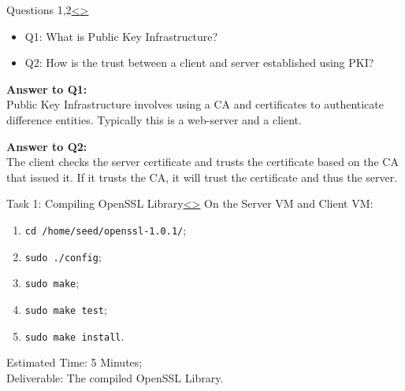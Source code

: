 \documentclass[12pt]{extarticle}
\newenvironment{instructionblock}{\Large\bgroup}{\egroup}
\newcommand{\ben}{\begin{enumerate}}
\newcommand{\een}{\end{enumerate}}
\newcommand{\bi}{\begin{itemize}}
\newcommand{\ei}{\end{itemize}}
\begin{document}

\pagebreak
\begin{slide}{Questions 1,2}{\hyperref[slide 6]{\textless}\hyperref[slide 8]{\textgreater}}
\begin{instructionblock}
\bi 
\item[Q1:] What is Public Key Infrastructure?
\item[Q2:] How is the trust between a client and server established using PKI?
\ei

\end{instructionblock}
\end{slide}
\vfill

\vspace{2mm}
\noindent
\textbf{Answer to Q1:}\\
Public Key Infrastructure involves using a CA and certificates to authenticate difference entities. Typically this is a web-server and a client.

\vspace{6mm}
\noindent
\textbf{Answer to Q2:}\\
The client checks the server certificate and trusts the certificate based on the CA that issued it. If it trusts the CA, it will trust the certificate and thus the server.


\pagebreak
\begin{slide}{Task 1: Compiling OpenSSL Library}{\hyperref[slide 7]{\textless}\hyperref[slide 9]{\textgreater}}
	\begin{instructionblock}
		On the Server VM and Client VM:
		\ben
			\item \texttt{cd /home/seed/openssl-1.0.1/};
			\item \texttt{sudo ./config};
			\item \texttt{sudo make};
			\item \texttt{sudo make test};
			\item \texttt{sudo make install}.
		\een
	\end{instructionblock}
\end{slide} 
\noindent
Estimated Time: 5 Minutes; \\
Deliverable: The compiled OpenSSL Library.
\end{document}
